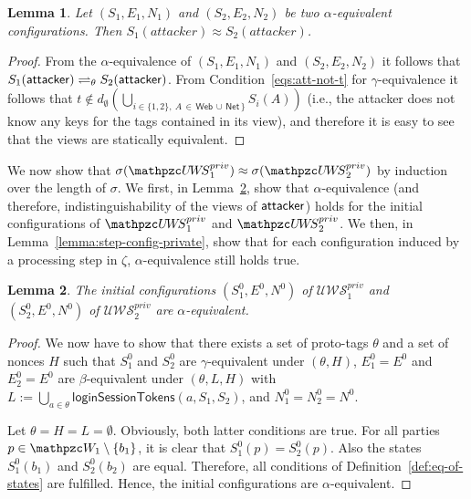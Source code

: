 \documentclass[letterpaper,onecolumn,10pt]{article}
\newtheorem{lemma}{Lemma}
\begin{document}
\begin{lemma}
  Let $(S_1,E_1,N_1)$ and $(S_2,E_2,N_2)$ be two 
  $\alpha$-equivalent configurations. 
  Then $S_1(attacker)\approx S_2(attacker)$.
\end{lemma}
\begin{proof}
  From the $\alpha$-equivalence of $(S_1,E_1,N_1)$ and 
  $(S_2,E_2,N_2)$ it follows that $S_1(\mathsf{attacker}) 
  \rightleftharpoons_{\theta} S_2(\mathsf{attacker})$.
  From Condition~\ref{eqs:att-not-t} for $\gamma$-equivalence 
  it follows that
  $t \not\in d_\emptyset(\bigcup_{i \in \{1,2\},\ A\, \in\, 
  \mathsf{Web}\, \cup \, \mathsf{Net}\, \}}S_i(A))$
  (i.e., the attacker does not know any keys for the tags 
  contained in its view), and therefore it is easy to see 
  that the views are statically equivalent.
\end{proof}

We now show that $\sigma(\uppressoprivwebsystem_1) \approx
\sigma(\uppressoprivwebsystem_2)$ by induction over the length 
of $\sigma$. We first, in Lemma~\ref{lemma:initial-config-private}, 
show that $\alpha$-equivalence (and therefore, indistinguishability 
of the views of $\mathsf{attacker}$) holds for the initial 
configurations of $\uppressoprivwebsystem_1$ and 
$\uppressoprivwebsystem_2$. We then, in 
Lemma~\ref{lemma:step-config-private}, show that for each 
configuration induced by a processing step in $\zeta$,
$\alpha$-equivalence still holds true.

\begin{lemma}\label{lemma:initial-config-private}
  The initial configurations $(S_1^0,E^0,N^0)$ of 
  $\mathcal{U\!W\!S}^{priv}_1$ and $(S_2^0,E^0,N^0)$ of 
  $\mathcal{U\!W\!S}^{priv}_2$ are $\alpha$-equivalent.
\end{lemma}
\begin{proof}
  We now have to show that there exists a set of proto-tags $\theta$ and a set of nonces $H$
  such that $S_1^0$ and $S_2^0$ are $\gamma$-equivalent under
  $(\theta,H)$, $E_1^0 = E^0$ and $E_2^0 = E^0$ are $\beta$-equivalent
  under $(\theta,L,H)$ with $L := \bigcup_{a\in\theta} \mathsf{loginSessionTokens}(a,S_1,S_2)$, and $N_1^0 = N_2^0 = N^0$.

  Let $\theta = H = L = \emptyset$. Obviously, both latter conditions are
  true. For all parties $p \in \bidsystem_1 \setminus \{b_1\}$, it is
  clear that $S_1^0(p) = S_2^0(p)$. Also the states $S_1^0(b_1)$ and
  $S_2^0(b_2)$ are equal. Therefore, all conditions
  of Definition~\ref{def:eq-of-states} are fulfilled. Hence, the
  initial configurations are $\alpha$-equivalent.
\end{proof}
\end{document}
